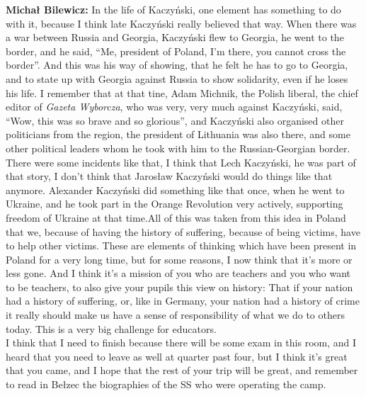 \textbf{Michał Bilewicz:} In the life of Kaczyński, one element has something to do with it, because I think late Kaczyński really believed that way. When there was a war between Russia and Georgia, Kaczyński flew to Georgia, he went to the border, and he said, ``Me, president of Poland, I’m there, you cannot cross the border''. And this was his way of showing, that he felt he has to go to Georgia, and to state up with Georgia against Russia to show solidarity, even if he loses his life. I remember that at that tine, Adam Michnik, the Polish liberal, the chief editor of \textit{Gazeta Wyborcza}, who was very, very much against Kaczyński, said, ``Wow, this was so brave and so glorious'', and Kaczyński also organised other politicians from the region, the president of Lithuania was also there, and some other political leaders whom he took with him to the Russian-Georgian border. There were some incidents like that, I think that Lech Kaczyński, he was part of that story, I don’t think that Jarosław Kaczyński would do things like that anymore. Alexander Kaczyński did something like that once, when he went to Ukraine, and he took part in the Orange Revolution very actively, supporting freedom of Ukraine at that time.All of this was taken from this idea in Poland that we, because of having the history of suffering, because of being victims, have to help other victims. These are elements of thinking which have been present in Poland for a very long time, but for some reasons, I now think that it’s more or less gone. And I think it’s a mission of you who are teachers and you who want to be teachers, to also give your pupils this view on history: That if your nation had a history of suffering, or, like in Germany, your nation had a history of crime it really should make us have a sense of responsibility of what we do to others today. This is a very big challenge for educators.\\
I think that I need to finish because there will be some exam in this room, and I heard that you need to leave as well at quarter past four, but I think it’s great that you came, and I hope that the rest of your trip will be great, and remember to read in Bełzec the biographies of the SS who were operating the camp. 